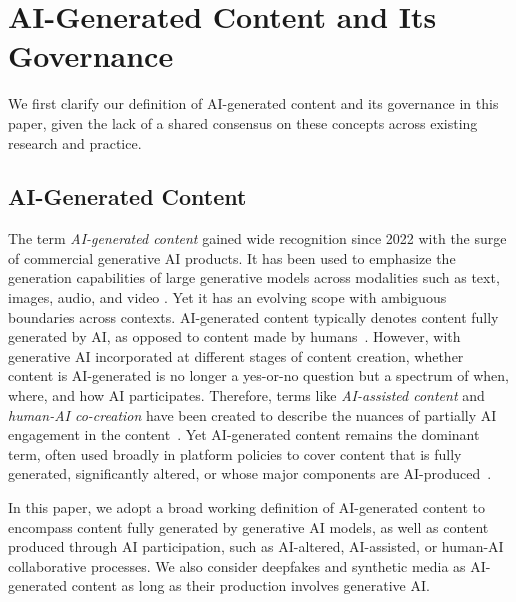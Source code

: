 \section{AI-Generated Content and Its Governance}
\label{sec:def}
We first clarify our definition of AI-generated content and its governance in this paper, given the lack of a shared consensus on these concepts across existing research and practice.

\subsection{AI-Generated Content}
\label{subsec:AIGC}
The term \textit{AI-generated content} gained wide recognition since 2022 with the surge of commercial generative AI products. It has been used to emphasize the generation capabilities of large generative models across modalities such as text, images, audio, and video \cite{cao2025survey, foo2025ai}. Yet it has an evolving scope with ambiguous boundaries across contexts. AI-generated content typically denotes content fully generated by AI, as opposed to content made by humans~\cite{cao2025survey}. However, with generative AI incorporated at different stages of content creation, whether content is AI-generated is no longer a yes-or-no question but a spectrum of when, where, and how AI participates. Therefore, terms like \textit{AI-assisted content} and \textit{human-AI co-creation} have been created to describe the nuances of partially AI engagement in the content~\cite{lloyd2025ai, 10.1145/3715336.3735683}. Yet AI-generated content remains the dominant term, often used broadly in platform policies to cover content that is fully generated, significantly altered, or whose major components are AI-produced~\cite{gao2026governance}.

In this paper, we adopt a broad working definition of AI-generated content to encompass content fully generated by generative AI models, as well as content produced through AI participation, such as AI-altered, AI-assisted, or human-AI collaborative processes. We also consider deepfakes and synthetic media as AI-generated content as long as their production involves generative AI.


